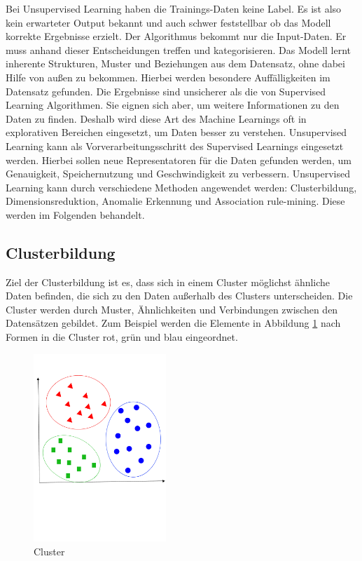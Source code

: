  Bei Unsupervised Learning haben die Trainings-Daten keine Label. \cite{Sarkar2018} Es ist also kein erwarteter Output bekannt und auch schwer feststellbar ob das Modell korrekte Ergebnisse erzielt. Der Algorithmus bekommt nur die Input-Daten. Er muss anhand dieser Entscheidungen treffen und kategorisieren. \cite{Mueller2016}\newline
	 Das Modell lernt inherente Strukturen, Muster und Beziehungen aus dem Datensatz, ohne dabei Hilfe von außen zu bekommen. \cite{Sarkar2018} Hierbei werden besondere Auffälligkeiten im Datensatz gefunden. \cite{Kirk2014} Die Ergebnisse sind unsicherer als die von Supervised Learning Algorithmen. Sie eignen sich aber, um weitere Informationen zu den Daten zu finden. \cite{Sarkar2018} Deshalb wird diese Art des Machine Learnings oft in explorativen Bereichen eingesetzt, um Daten besser zu verstehen. Unsupervised Learning kann als Vorverarbeitungsschritt des Supervised Learnings eingesetzt werden. Hierbei sollen neue Representatoren für die Daten gefunden werden, um Genauigkeit, Speichernutzung und Geschwindigkeit zu verbessern. \cite{Mueller2016}
	 Unsupervised Learning kann durch verschiedene Methoden angewendet werden: Clusterbildung, Dimensionsreduktion, Anomalie Erkennung und Association rule-mining. \cite{Sarkar2018} Diese werden im Folgenden behandelt.
	 
	 \subsection{Clusterbildung}
	 Ziel der Clusterbildung ist es, dass sich in einem Cluster möglichst ähnliche Daten befinden, die sich zu den Daten außerhalb des Clusters unterscheiden. \cite{Mueller2016} Die Cluster werden durch Muster, Ähnlichkeiten und Verbindungen zwischen den Datensätzen gebildet. \cite{Sarkar2018} Zum Beispiel werden die Elemente in Abbildung \ref{fig:abb3} nach Formen in die Cluster rot, grün und blau eingeordnet. \cite{Sarkar2018}
	 \begin{figure}[h!]
	 	\centering
	 	\includegraphics[width=5cm]{Bilder/Cluster.pdf}
	 	\caption{Cluster}
	 	\label{fig:abb3}
	 \end{figure}
	 
